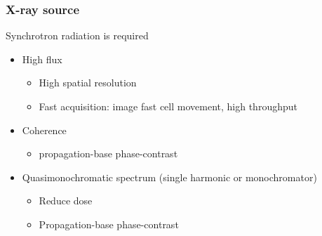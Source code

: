 \documentclass{beamer}
\begin{document}
\begin{frame}
  \frametitle{X-ray source}
  Synchrotron radiation is required
  \begin{itemize}
    \item High flux
    \begin{itemize}
    \item High spatial resolution
    \item Fast acquisition: image fast cell movement, high throughput
    \end{itemize}
  \item Coherence
    \begin{itemize}
    \item propagation-base phase-contrast
    \end{itemize}
    \item Quasimonochromatic spectrum (single harmonic or  monochromator)
    \begin{itemize}
    \item Reduce dose
    \item Propagation-base phase-contrast
    \end{itemize}
  \end{itemize}
  \vfill
  \centering
\end{frame}
\end{document}
